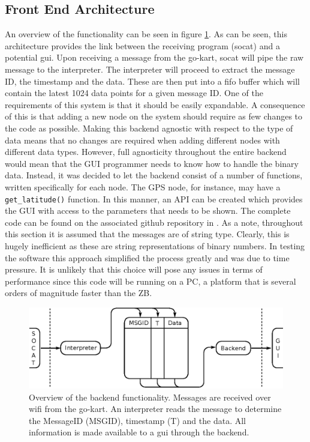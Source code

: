 \subsection{Front End Architecture}\label{sec:frontend}
An overview of the functionality can be seen in figure \ref{fig:backendconcept}.
As can be seen, this architecture provides the link between the receiving program (socat) and a potential \acs{gui}.
Upon receiving a message from the go-kart, socat will pipe the raw message to the interpreter.
The interpreter will proceed to extract the message ID, the timestamp and the data.
These are then put into a fifo buffer which will contain the latest 1024 data points for a given message ID.
One of the requirements of this system is that it should be easily expandable.
A consequence of this is that adding a new node on the system should require as few changes to the code as possible.
Making this backend agnostic with respect to the type of data means that no changes are required when adding different nodes with different data types.
However, full agnosticity throughout the entire backend would mean that the GUI programmer needs to know how to handle the binary data.
Instead, it was decided to let the backend consist of a number of functions, written specifically for each node.
The GPS node, for instance, may have a \texttt{get\_latitude()} function.
In this manner, an API can be created which provides the GUI with access to the parameters that needs to be shown.
The complete code can be found on the associated github repository in .
As a note, throughout this section it is assumed that the messages are of string type.
Clearly, this is hugely inefficient as these are string representations of binary numbers.
In testing the software this approach simplified the process greatly and was due to time pressure.
It is unlikely that this choice will pose any issues in terms of performance since this code will be running on a PC, a platform that is several orders of magnitude faster than the ZB.

\begin{figure}
	\includegraphics[width=\linewidth]{graphics/backend_concept}
	\caption[Overview of the backend functionality.]{Overview of the backend functionality. 
	Messages are received over wifi from the go-kart. 
	An interpreter reads the message to determine the MessageID (MSGID), timestamp (T) and the data. 
	All information is made available to a \acs{gui} through the backend.}
	\label{fig:backendconcept}
\end{figure}

